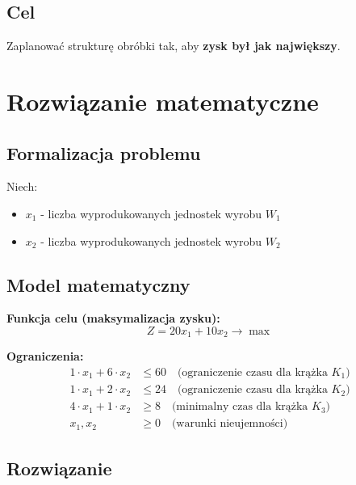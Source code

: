 \documentclass[12pt,a4paper]{article}
\begin{document}
\subsection{Cel}

Zaplanować strukturę obróbki tak, aby \textbf{zysk był jak największy}.

\section{Rozwiązanie matematyczne}

\subsection{Formalizacja problemu}

Niech:
\begin{itemize}
    \item $x_1$ - liczba wyprodukowanych jednostek wyrobu $W_1$
    \item $x_2$ - liczba wyprodukowanych jednostek wyrobu $W_2$
\end{itemize}

\subsection{Model matematyczny}

\textbf{Funkcja celu (maksymalizacja zysku):}
\begin{equation}
Z = 20x_1 + 10x_2 \rightarrow \max
\end{equation}

\textbf{Ograniczenia:}
\begin{align}
1 \cdot x_1 + 6 \cdot x_2 &\leq 60 \quad \text{(ograniczenie czasu dla krążka } K_1\text{)} \\
1 \cdot x_1 + 2 \cdot x_2 &\leq 24 \quad \text{(ograniczenie czasu dla krążka } K_2\text{)} \\
4 \cdot x_1 + 1 \cdot x_2 &\geq 8 \quad \text{(minimalny czas dla krążka } K_3\text{)} \\
x_1, x_2 &\geq 0 \quad \text{(warunki nieujemności)}
\end{align}

\subsection{Rozwiązanie}
\end{document}
